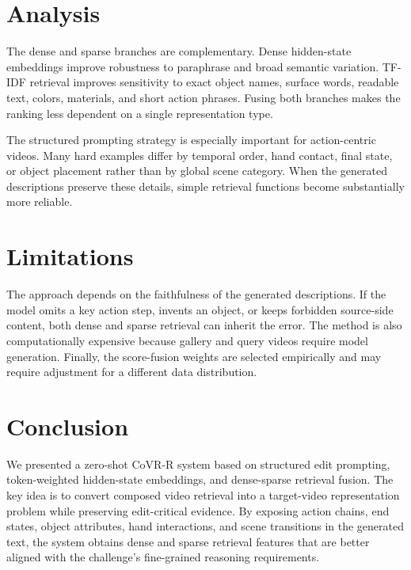 \documentclass[10pt,twocolumn,letterpaper]{article}
\begin{document}
\section{Analysis}

The dense and sparse branches are complementary.
Dense hidden-state embeddings improve robustness to paraphrase and broad semantic variation.
TF-IDF retrieval improves sensitivity to exact object names, surface words, readable text, colors, materials, and short action phrases.
Fusing both branches makes the ranking less dependent on a single representation type.

The structured prompting strategy is especially important for action-centric videos.
Many hard examples differ by temporal order, hand contact, final state, or object placement rather than by global scene category.
When the generated descriptions preserve these details, simple retrieval functions become substantially more reliable.

\section{Limitations}

The approach depends on the faithfulness of the generated descriptions.
If the model omits a key action step, invents an object, or keeps forbidden source-side content, both dense and sparse retrieval can inherit the error.
The method is also computationally expensive because gallery and query videos require model generation.
Finally, the score-fusion weights are selected empirically and may require adjustment for a different data distribution.

\section{Conclusion}

We presented a zero-shot CoVR-R system based on structured edit prompting, token-weighted hidden-state embeddings, and dense-sparse retrieval fusion.
The key idea is to convert composed video retrieval into a target-video representation problem while preserving edit-critical evidence.
By exposing action chains, end states, object attributes, hand interactions, and scene transitions in the generated text, the system obtains dense and sparse retrieval features that are better aligned with the challenge's fine-grained reasoning requirements.

{\small


}
\end{document}
